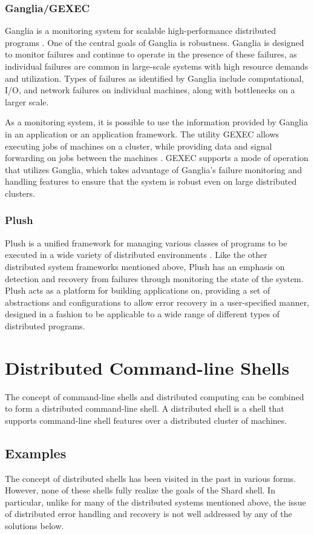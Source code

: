 \documentclass[twoside]{report}
\begin{document}
\subsubsection{Ganglia/GEXEC}
Ganglia is a monitoring system for scalable high-performance distributed programs \cite{MASSIE2004817}.
One of the central goals of Ganglia is robustness.
Ganglia is designed to monitor failures and continue to operate in the presence of these failures, as individual failures are common in large-scale systems with high resource demands and utilization.
Types of failures as identified by Ganglia include computational, I/O, and network failures on individual machines, along with bottlenecks on a larger scale.

As a monitoring system, it is possible to use the information provided by Ganglia in an application or an application framework.
The utility GEXEC allows executing jobs of machines on a cluster, while providing data and signal forwarding on jobs between the machines \cite{gexec}.
GEXEC supports a mode of operation that utilizes Ganglia, which takes advantage of Ganglia's failure monitoring and handling features to ensure that the system is robust even on large distributed clusters.

\subsubsection{Plush}
Plush is a unified framework for managing various classes of programs to be executed in a wide variety of distributed environments \cite{10.5555/1349426.1349441}.
Like the other distributed system frameworks mentioned above, Plush has an emphasis on detection and recovery from failures through monitoring the state of the system.
Plush acts as a platform for building applications on, providing a set of abstractions and configurations to allow error recovery in a user-specified manner, designed in a fashion to be applicable to a wide range of different types of distributed programs.

\section{Distributed Command-line Shells}
The concept of command-line shells and distributed computing can be combined to form a distributed command-line shell.
A distributed shell is a shell that supports command-line shell features over a distributed cluster of machines.

\subsection{Examples}
The concept of distributed shells has been visited in the past in various forms.
However, none of these shells fully realize the goals of the Shard shell.
In particular, unlike for many of the distributed systems mentioned above, the issue of distributed error handling and recovery is not well addressed by any of the solutions below.
\end{document}
